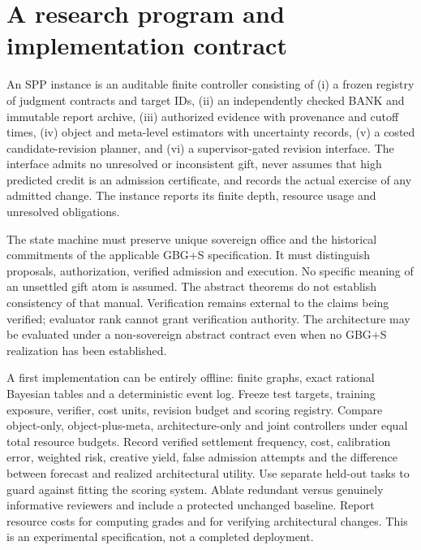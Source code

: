 \documentclass[11pt]{article}
\begin{document}
\section{A research program and implementation contract}
\begin{definition}
An SPP instance is an auditable finite controller consisting of (i) a frozen registry of judgment contracts and target IDs, (ii) an independently checked BANK and immutable report archive, (iii) authorized evidence with provenance and cutoff times, (iv) object and meta-level estimators with uncertainty records, (v) a costed candidate-revision planner, and (vi) a supervisor-gated revision interface. The interface admits no unresolved or inconsistent gift, never assumes that high predicted credit is an admission certificate, and records the actual exercise of any admitted change. The instance reports its finite depth, resource usage and unresolved obligations.
\end{definition}
The state machine must preserve unique sovereign office and the historical commitments of the applicable GBG+S specification. It must distinguish proposals, authorization, verified admission and execution. No specific meaning of an unsettled gift atom is assumed. The abstract theorems do not establish consistency of that manual. Verification remains external to the claims being verified; evaluator rank cannot grant verification authority. The architecture may be evaluated under a non-sovereign abstract contract even when no GBG+S realization has been established.

A first implementation can be entirely offline: finite graphs, exact rational Bayesian tables and a deterministic event log. Freeze test targets, training exposure, verifier, cost units, revision budget and scoring registry. Compare object-only, object-plus-meta, architecture-only and joint controllers under equal total resource budgets. Record verified settlement frequency, cost, calibration error, weighted risk, creative yield, false admission attempts and the difference between forecast and realized architectural utility. Use separate held-out tasks to guard against fitting the scoring system. Ablate redundant versus genuinely informative reviewers and include a protected unchanged baseline. Report resource costs for computing grades and for verifying architectural changes. This is an experimental specification, not a completed deployment.
\end{document}
